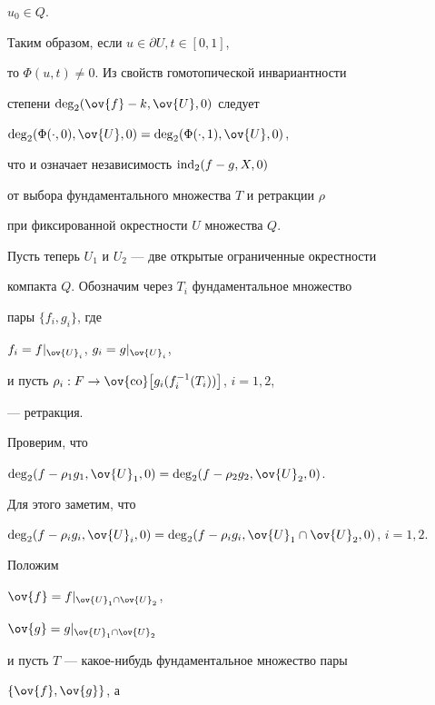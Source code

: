 $u_0 \in Q$.





Таким образом, если $ u\in\partial U, t\in [0,1] $,


то $\Phi (u,t) \ne 0$. Из свойств гомотопической инвариантности


степени $\Deg_2 (\ov {f} - k, \ov {U}, 0)$ следует 


$\Deg_2 (\Phi (\cdot,0), \ov {U}, 0) = 


\Deg_2 (\Phi (\cdot,1), \ov {U}, 0)$,


что и означает независимость $\operatorname{ind}_2 (f - g, X, 0)$


от выбора фундаментального множества $T$ и ретракции $\rho$


при фиксированной окрестности $U$ множества $Q$.





Пусть теперь $U_1$ и $U_2$ --- две открытые ограниченные окрестности


компакта $Q$. Обозначим через $T_i$ фундаментальное множество 


пары $\{f_i, g_i \}$, где 


$f_i = f|_{\ov {U}_i}$, $g_i = g|_{\ov {U}_i}$,


и пусть $\rho_i : F \to \ov {\co} 


\bigl[g_i (f_i^{-1}(T_i)) \bigr]$, $i = 1, 2 $,


--- ретракция.





Проверим, что 


$\Deg_2 (f - \rho_1 g_1, \ov {U}_1, 0) = 


\Deg_2 (f - \rho_2 g_2, \ov {U}_2, 0)$.


Для этого заметим, что 


$\Deg_2 (f - \rho_i g_i, \ov {U}_i, 0) = 


\Deg_2 (f - \rho_i g_i, \ov {U}_1 \cap


\ov {U}_2, 0)$, $i = 1,2$.





Положим


$\ov {f} = f|_{\ov {U}_1 \cap \ov {U}_2}$,


$\ov {g} = g|_{\ov {U}_1 \cap \ov {U}_2}$


и пусть $T$ --- какое-нибудь фундаментальное множество пары 


$\{\ov{f}, \ov{g} \}$, а 


